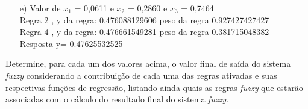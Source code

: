 \documentclass{report}
\begin{document}
\begin{enumerate}
\begin{enumerate}
\item[e)]Valor de $x_1$ = 0,0611 e $x_2$ = 0,2860 e $x_3$ = 0,7464\\
Regra 2 , y da regra: 0.476088129606 peso da regra 0.927427427427 \\
Regra 4 , y da regra: 0.476661549281 peso da regra 0.381715048382 \\
Resposta y= 0.47625532525

\end{enumerate}
Determine, para cada um dos valores acima, o valor final de saída do sistema \emph{fuzzy}
considerando a contribuição de cada uma das regras ativadas e suas respectivas funções de
regressão, listando ainda quais as regras \emph{fuzzy} que estarão associadas com o cálculo do
resultado final do sistema \emph{fuzzy}.
\end{enumerate}


\newpage
\lstset{basicstyle=\footnotesize}

\end{document}
